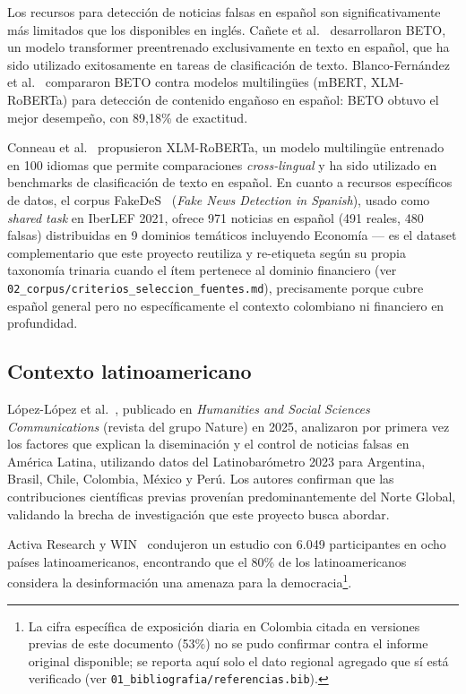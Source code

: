Los recursos para detección de noticias falsas en español son significativamente más limitados que los disponibles en inglés. Cañete et al.~\cite{Canete2020} desarrollaron BETO, un modelo transformer preentrenado exclusivamente en texto en español, que ha sido utilizado exitosamente en tareas de clasificación de texto. Blanco-Fernández et al.~\cite{BlancoFernandez2024} compararon BETO contra modelos multilingües (mBERT, XLM-RoBERTa) para detección de contenido engañoso en español: BETO obtuvo el mejor desempeño, con 89,18\% de exactitud.

Conneau et al.~\cite{Conneau2020} propusieron XLM-RoBERTa, un modelo multilingüe entrenado en 100 idiomas que permite comparaciones \textit{cross-lingual} y ha sido utilizado en benchmarks de clasificación de texto en español. En cuanto a recursos específicos de datos, el corpus FakeDeS~\cite{GomezAdorno2021FakeDeS} (\textit{Fake News Detection in Spanish}), usado como \textit{shared task} en IberLEF 2021, ofrece 971 noticias en español (491 reales, 480 falsas) distribuidas en 9 dominios temáticos incluyendo Economía — es el dataset complementario que este proyecto reutiliza y re-etiqueta según su propia taxonomía trinaria cuando el ítem pertenece al dominio financiero (ver \texttt{02\_corpus/criterios\_seleccion\_fuentes.md}), precisamente porque cubre español general pero no específicamente el contexto colombiano ni financiero en profundidad.

\subsection{Contexto latinoamericano}

López-López et al.~\cite{Nature2025}, publicado en \textit{Humanities and Social Sciences Communications} (revista del grupo Nature) en 2025, analizaron por primera vez los factores que explican la diseminación y el control de noticias falsas en América Latina, utilizando datos del Latinobarómetro 2023 para Argentina, Brasil, Chile, Colombia, México y Perú. Los autores confirman que las contribuciones científicas previas provenían predominantemente del Norte Global, validando la brecha de investigación que este proyecto busca abordar.

Activa Research y WIN~\cite{ActivaResearch2022} condujeron un estudio con 6.049 participantes en ocho países latinoamericanos, encontrando que el 80\% de los latinoamericanos considera la desinformación una amenaza para la democracia\footnote{La cifra específica de exposición diaria en Colombia citada en versiones previas de este documento (53\%) no se pudo confirmar contra el informe original disponible; se reporta aquí solo el dato regional agregado que sí está verificado (ver \texttt{01\_bibliografia/referencias.bib}).}.

